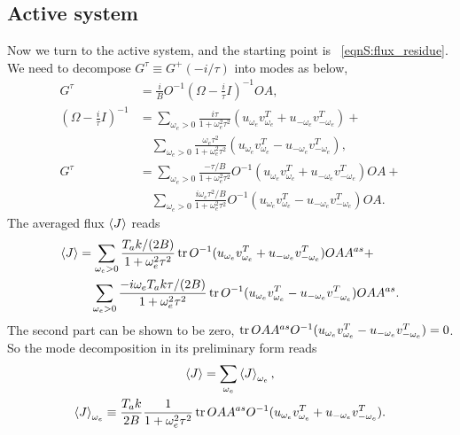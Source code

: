 \documentclass[
 amsmath,amssymb,
 aps,
 pre,
 longbibliography,
 10pt, onecolumn,
 notitlepage
]{revtex4-1}
\begin{document}
\subsection{Active system}
Now we turn to the active system, and the starting point is \eqnname~\eqref{eqnS:flux_residue}.
We need to decompose $G^\tau \equiv G^+(-i/\tau)$ into modes as below,
\begin{align}
G^\tau &= \frac{i}{B} O^{-1} (\Omega - \frac{i}{\tau}I)^{-1} OA ,\\
(\Omega - \frac{i}{\tau}I)^{-1} &=
\sum_{\omega_e > 0}\frac{i\tau}{1 + \omega_e^2 \tau^2}  (u_{\omega_e} v_{\omega_e}^T + u_{-\omega_e} v_{-\omega_e}^T) + \\
&\quad \sum_{\omega_e > 0}\frac{\omega_e\tau^2}{1 + \omega_e^2 \tau^2}  (u_{\omega_e} v_{\omega_e}^T - u_{-\omega_e} v_{-\omega_e}^T) ,\\
G^\tau &= \sum_{\omega_e > 0}\frac{-\tau/B}{1 + \omega_e^2 \tau^2} O^{-1} (u_{\omega_e} v_{\omega_e}^T + u_{-\omega_e} v_{-\omega_e}^T) OA + \\
&\quad \sum_{\omega_e > 0}\frac{i\omega_e\tau^2/B}{1 + \omega_e^2 \tau^2} O^{-1} (u_{\omega_e} v_{\omega_e}^T - u_{-\omega_e} v_{-\omega_e}^T) OA .
\end{align}
The averaged flux $\expval{J}$ reads
\begin{equation}
\begin{split}
\expval{J} &=
\sum_{\omega_e > 0}\frac{T_ak/(2B)}{1 + \omega_e^2 \tau^2} \tr O^{-1} (u_{\omega_e} v_{\omega_e}^T + u_{-\omega_e} v_{-\omega_e}^T) OAA^{as} + \\
&\quad \sum_{\omega_e > 0}\frac{-i\omega_e T_ak\tau/(2B)}{1 + \omega_e^2 \tau^2} \tr O^{-1} (u_{\omega_e} v_{\omega_e}^T - u_{-\omega_e} v_{-\omega_e}^T) OAA^{as}.
\end{split}
\end{equation}
The second part can be shown to be zero,
$\tr OAA^{as}O^{-1} (u_{\omega_e} v_{\omega_e}^T - u_{-\omega_e} v_{-\omega_e}^T) = 0$.
So the mode decomposition in its preliminary form reads
\begin{gather}
\expval{J} = \sum_{\omega_e} \expval{J}_{\omega_e} ,\\
\expval{J}_{\omega_e} \equiv \frac{T_ak}{2B}\frac{1}{1 + \omega_e^2 \tau^2} \tr OAA^{as}O^{-1} (u_{\omega_e} v_{\omega_e}^T + u_{-\omega_e} v_{-\omega_e}^T). \label{eqnS:mode_J_active}
\end{gather}
\end{document}
